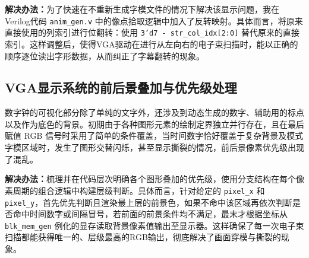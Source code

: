 \documentclass[11pt,a4paper]{article}
\begin{document}
\textbf{解决办法：}为了快速在不重新生成字模文件的情况下解决该显示问题，我在Verilog代码 \texttt{anim\_gen.v} 中的像点拾取逻辑中加入了反转映射。具体而言，将原来直接使用的列索引进行位翻转：使用 \texttt{3'd7 - str\_col\_idx[2:0]} 替代原来的直接索引。这样调整后，使得VGA驱动在进行从左向右的电子束扫描时，能以正确的顺序逐位读出字形数据，从而纠正了字幕翻转的现象。

\subsection{VGA显示系统的前后景叠加与优先级处理}

数字钟的可视化部分除了单纯的文字外，还涉及到动态生成的数字、辅助用的标点以及作为底色的背景。初期由于各种图形元素的绘制定界独立并行存在，且在最后赋值 RGB 信号时采用了简单的条件覆盖，当时间数字恰好覆盖于复杂背景及模式字模区域时，发生了图形交替闪烁，甚至显示撕裂的情况，前后景像素优先级出现了混乱。

\textbf{解决办法：}梳理并在代码层次明确各个图形叠加的优先级，使用分支结构在每个像素周期的组合逻辑中构建层级判断。具体而言，针对给定的 \texttt{pixel\_x} 和 \texttt{pixel\_y}，首先优先判断且渲染最上层的前景色，如果不命中该区域再依次判断是否命中时间数字或间隔冒号，若前面的前景条件均不满足，最末才根据坐标从 \texttt{blk\_mem\_gen} 例化的显存读取背景像素值输出至显示器。这样确保了每一次电子束扫描都能获得唯一的、层级最高的RGB输出，彻底解决了画面穿模与撕裂的现象。
\end{document}
